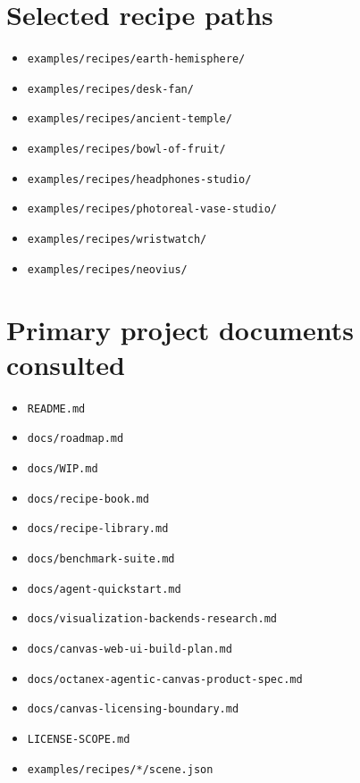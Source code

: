 \documentclass[11pt,a4paper]{article}
\begin{document}
\appendix
\section{Selected recipe paths}

\begin{itemize}[leftmargin=*]
  \item \texttt{examples/recipes/earth-hemisphere/}
  \item \texttt{examples/recipes/desk-fan/}
  \item \texttt{examples/recipes/ancient-temple/}
  \item \texttt{examples/recipes/bowl-of-fruit/}
  \item \texttt{examples/recipes/headphones-studio/}
  \item \texttt{examples/recipes/photoreal-vase-studio/}
  \item \texttt{examples/recipes/wristwatch/}
  \item \texttt{examples/recipes/neovius/}
\end{itemize}

\section{Primary project documents consulted}

\begin{itemize}[leftmargin=*]
  \item \texttt{README.md}
  \item \texttt{docs/roadmap.md}
  \item \texttt{docs/WIP.md}
  \item \texttt{docs/recipe-book.md}
  \item \texttt{docs/recipe-library.md}
  \item \texttt{docs/benchmark-suite.md}
  \item \texttt{docs/agent-quickstart.md}
  \item \texttt{docs/visualization-backends-research.md}
  \item \texttt{docs/canvas-web-ui-build-plan.md}
  \item \texttt{docs/octanex-agentic-canvas-product-spec.md}
  \item \texttt{docs/canvas-licensing-boundary.md}
  \item \texttt{LICENSE-SCOPE.md}
  \item \texttt{examples/recipes/*/scene.json}
\end{itemize}
\end{document}
